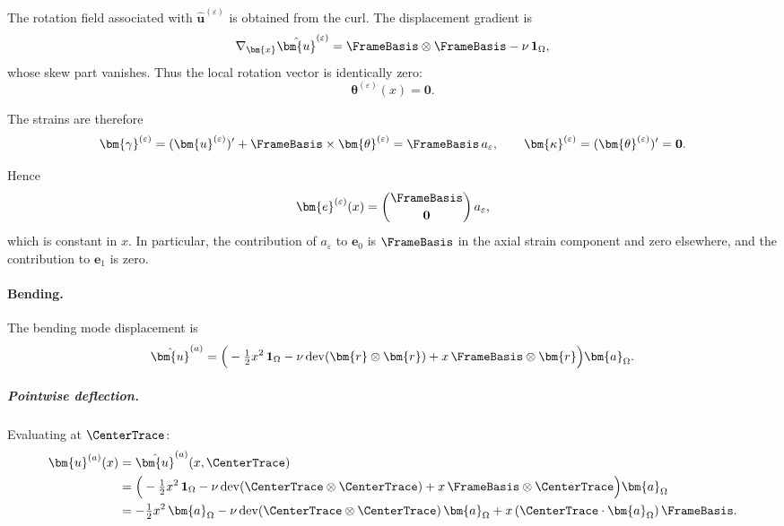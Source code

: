 The rotation field associated with $\hat{\bm{u}}^{(\varepsilon)}$ is obtained 
from the curl. The displacement gradient is
\[
\nabla_{\bm{x}}\hat{\bm{u}}^{(\varepsilon)}
=
\FrameBasis \otimes \FrameBasis - \nu\,\mathbf{1}_\Omega,
\]
whose skew part vanishes. Thus the local rotation vector is identically zero:
\begin{equation*}
\bm{\theta}^{(\varepsilon)}(x) = \mathbf{0}.
\end{equation*}

The strains are therefore
\begin{equation*}
\bm{\gamma}^{(\varepsilon)} 
= (\bm{u}^{(\varepsilon)})' + \FrameBasis \times \bm{\theta}^{(\varepsilon)}
= \FrameBasis\,a_\varepsilon,
\qquad
\bm{\kappa}^{(\varepsilon)} 
= (\bm{\theta}^{(\varepsilon)})' = \mathbf{0}.
\end{equation*}

Hence
\begin{equation}
\bm{e}^{(\varepsilon)}(x)
=
\begin{pmatrix}
\FrameBasis \\[2pt]
\mathbf{0}
\end{pmatrix} a_\varepsilon,
\end{equation}
which is constant in $x$. In particular, the contribution of $a_\varepsilon$ to 
$\bm{e}_0$ is $\FrameBasis$ in the axial strain component and zero elsewhere, 
and the contribution to $\bm{e}_1$ is zero.

\paragraph{Bending.}

The bending mode displacement is
\begin{equation*}
\hat{\bm{u}}^{(a)} = \Big( -\tfrac{1}{2}x^2\,\mathbf{1}_\Omega 
- \nu\,\mathrm{dev}(\bm{r} \otimes \bm{r}) 
+ x\,\FrameBasis \otimes \bm{r} \Big) \bm{a}_\Omega.
\end{equation*}

\subparagraph{Pointwise deflection.}
Evaluating at $\CenterTrace$:
\begin{align*}
\bm{u}^{(a)}(x)
&=
\hat{\bm{u}}^{(a)}(x,\CenterTrace) \\
&=
\Big( -\tfrac{1}{2}x^2\,\mathbf{1}_\Omega 
- \nu\,\mathrm{dev}(\CenterTrace \otimes \CenterTrace) 
+ x\,\FrameBasis \otimes \CenterTrace \Big) \bm{a}_\Omega \\
&=
-\tfrac{1}{2}x^2\,\bm{a}_\Omega
- \nu\,\mathrm{dev}(\CenterTrace \otimes \CenterTrace)\,\bm{a}_\Omega
+ x\,(\CenterTrace\cdot\bm{a}_\Omega)\,\FrameBasis.
\end{align*}

